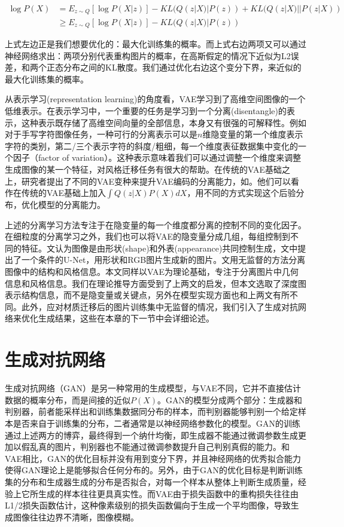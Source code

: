 \documentclass[UTF8,openany,AutoFakeBold,AutoFakeSlant,cs4size]{ctexbook}
\begin{document}
\begin{equation}
	\begin{aligned}
		\log P(X) &= E_{z \sim Q}[\log P(X|z)] - KL(Q(z|X) | P(z)) + KL(Q(z|X) || P(z|X)) \\
		&\geq E_{z \sim Q}[\log P(X|z)] - KL(Q(z|X) | P(z))
	\end{aligned}
\end{equation}

上式左边正是我们想要优化的：最大化训练集的概率。而上式右边两项又可以通过神经网络求出：两项分别代表重构图片的概率，在高斯假定的情况下近似为L2误差，和两个正态分布之间的KL散度。我们通过优化右边这个变分下界，来近似的最大化训练集的概率。

从表示学习(representation learning)的角度看，VAE学习到了高维空间图像的一个低维表示。在表示学习中，一个重要的任务是学习到一个分离(disentangle)的表示，这种表示既存储了高维空间向量的全部信息，本身又有很强的可解释性。例如对于手写字符图像任务，一种可行的分离表示可以是$n$维隐变量的第一个维度表示字符的类别，第二/三个表示字符的斜度/粗细，每一个维度表征数据集中变化的一个因子（factor of variation）。这种表示意味着我们可以通过调整一个维度来调整生成图像的某一个特征，对风格迁移任务有很大的帮助。在传统的VAE基础之上，研究者提出了不同的VAE变种来提升VAE编码的分离能力，如\cite{Burgess2018UnderstandingDI, RubSchTol18b}。他们可以看作在传统的VAE基础上加入$\int Q(z|X) P(X) dX$，用不同的方式实现这个后验分布，优化模型的分离能力。

上述的分离学习方法专注于在隐变量的每一个维度都分离的控制不同的变化因子。在细粒度的分离学习之外，我们也可以将VAE的隐变量分成几组，每组控制到不同的特征。\cite{vunet2018}文认为图像是由形状(shape)和外表(appearance)共同控制生成，文中提出了一个条件的U-Net，用形状和RGB图片生成新的图片。\cite{Wu2019DisentanglingCA}文用无监督的方法分离图像中的结构和风格信息。本文同样以VAE为理论基础，专注于分离图片中几何信息和风格信息。我们在理论推导方面受到了上两文的启发，但本文选取了深度图表示结构信息，而不是隐变量\cite{vunet2018}或关键点\cite{Wu2019DisentanglingCA}，另外在模型实现方面也和上两文有所不同。此外，应对材质迁移后的图片训练集中无监督的情况，我们引入了生成对抗网络来优化生成结果，这些在本章的下一节中会详细论述。

\section{生成对抗网络}

生成对抗网络（GAN）是另一种常用的生成模型，与VAE不同，它并不直接估计数据的概率分布，而是间接的近似$P(X)$。GAN的模型分成两个部分：生成器和判别器，前者能采样出和训练集数据同分布的样本，而判别器能够判别一个给定样本是否来自于训练集的分布，二者通常是以神经网络参数化的模型。GAN的训练通过上述两方的博弈，最终得到一个纳什均衡，即生成器不能通过微调参数生成更加以假乱真的图片，判别器也不能通过微调参数提升自己判别真假的能力。和VAE相比，GAN的优化目标并没有用到变分下界，并且神经网络的优秀拟合能力使得GAN理论上是能够拟合任何分布的。另外，由于GAN的优化目标是判断训练集的分布和生成器生成的分布是否拟合，对每一个样本从整体上判断生成质量，经验上它所生成的样本往往更具真实性。而VAE由于损失函数中的重构损失往往由L1/2损失函数估计，这种像素级别的损失函数偏向于生成一个平均图像，导致生成图像往往边界不清晰，图像模糊。
\end{document}
